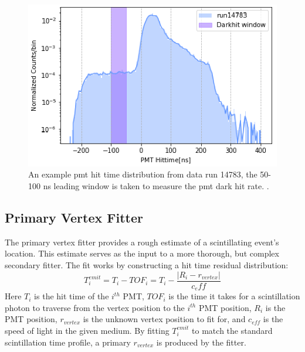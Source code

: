 \begin{figure}[htb]
	\centering
	\includegraphics[scale=0.4]{darkrate.png}
	\caption{An example pmt hit time distribution from data run 14783, the 50-100 ns leading window is taken to measure the pmt dark hit rate. \cite{li_phd}.}
	\label{fig:darkrate}
\end{figure}

\subsection{Primary Vertex Fitter}
The primary vertex fitter provides a rough estimate of a scintillating event's location. This estimate serves as the input to a more thorough, but complex secondary fitter. The fit works by constructing a hit time residual distribution:
\begin{equation}
	T_{i}^{emit}=T_i-TOF_i = T_i - \frac{\left|R_i-r_{vertex}\right|}{c_eff}
	\label{eq:prim_vertex}
\end{equation}
Here $T_i$ is the hit time of the $i^{th}$ PMT, $TOF_i$ is the time it takes for a scintillation photon to traverse from the vertex position to the $i^{th}$ PMT position, $R_i$ is the PMT position, $r_{vertex}$ is the unknown vertex position to fit for, and $c_{eff}$ is the speed of light in the given medium. By fitting $T_i^{emit}$ to match the standard scintillation time profile, a primary $r_{vertex}$ is produced by the fitter.

